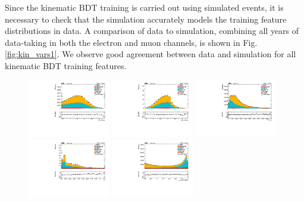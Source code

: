 Since the kinematic BDT training is carried out using simulated events, it is necessary to check that the simulation accurately models the training feature distributions in data. 
A comparison of data to simulation, combining all years of data-taking in both the electron and muon channels, is shown in Fig. \ref{fig:kin_vars1}. We observe good agreement between
data and simulation for all kinematic BDT training features. 

\begin{figure}[tb]
	\begin{center}
		\includegraphics[width=0.32\textwidth]{fig/MVA/sc_all_kin_dRlg1_valid_ptwei_cat0.pdf}
		\includegraphics[width=0.32\textwidth]{fig/MVA/sc_all_kin_dRlg2_valid_ptwei_cat0.pdf}
		\includegraphics[width=0.32\textwidth]{fig/MVA/sc_all_kin_mllgmllgpt_valid_ptwei_cat0.pdf}\\
		\includegraphics[width=0.32\textwidth]{fig/MVA/sc_all_kin_phores_valid_ptwei_cat0.pdf}
		\includegraphics[width=0.32\textwidth]{fig/MVA/sc_all_kin_phomva_valid_ptwei_EB_cat0.pdf}

\end{center}
\end{figure}

